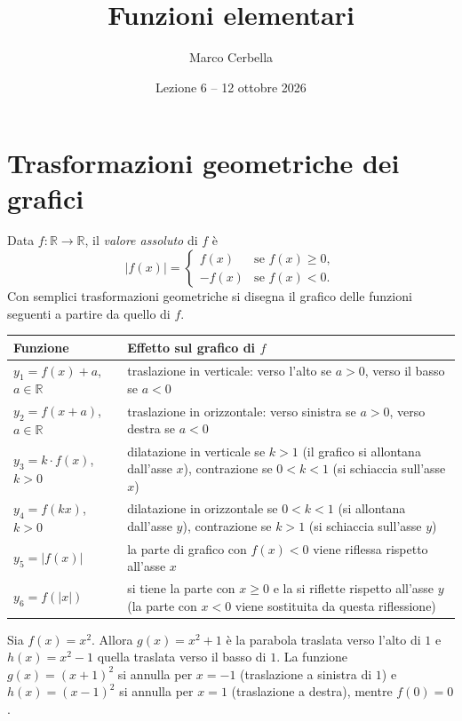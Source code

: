 \documentclass[11pt,a4paper]{article}
\title{Funzioni elementari}
\author{Marco Cerbella}
\date{Lezione 6 -- 12 ottobre 2026}
\begin{document}
\maketitle

\section{Trasformazioni geometriche dei grafici}

Data $f : \mathbb{R} \to \mathbb{R}$, il \emph{valore assoluto} di $f$ è
\[
|f(x)| =
\begin{cases}
f(x) & \text{se } f(x) \ge 0, \\
-f(x) & \text{se } f(x) < 0.
\end{cases}
\]
Con semplici trasformazioni geometriche si disegna il grafico delle funzioni seguenti a partire da quello di $f$.

\begin{center}
\renewcommand{\arraystretch}{1.3}
\begin{tabular}{@{}lp{9.5cm}@{}}
\toprule
Funzione & Effetto sul grafico di $f$ \\
\midrule
$y_1 = f(x) + a$, $a \in \mathbb{R}$ & traslazione in verticale: verso l'alto se $a > 0$, verso il basso se $a < 0$ \\
$y_2 = f(x + a)$, $a \in \mathbb{R}$ & traslazione in orizzontale: verso sinistra se $a > 0$, verso destra se $a < 0$ \\
$y_3 = k \cdot f(x)$, $k > 0$ & dilatazione in verticale se $k > 1$ (il grafico si allontana dall'asse $x$), contrazione se $0 < k < 1$ (si schiaccia sull'asse $x$) \\
$y_4 = f(kx)$, $k > 0$ & dilatazione in orizzontale se $0 < k < 1$ (si allontana dall'asse $y$), contrazione se $k > 1$ (si schiaccia sull'asse $y$) \\
$y_5 = |f(x)|$ & la parte di grafico con $f(x) < 0$ viene riflessa rispetto all'asse $x$ \\
$y_6 = f(|x|)$ & si tiene la parte con $x \ge 0$ e la si riflette rispetto all'asse $y$ (la parte con $x < 0$ viene sostituita da questa riflessione) \\
\bottomrule
\end{tabular}
\end{center}

\begin{esempio}[Parabola]
Sia $f(x) = x^2$. Allora $g(x) = x^2 + 1$ è la parabola traslata verso l'alto di $1$ e $h(x) = x^2 - 1$ quella traslata verso il basso di $1$. La funzione $g(x) = (x+1)^2$ si annulla per $x = -1$ (traslazione a sinistra di $1$) e $h(x) = (x-1)^2$ si annulla per $x = 1$ (traslazione a destra), mentre $f(0) = 0$.
\end{esempio}
\end{document}
